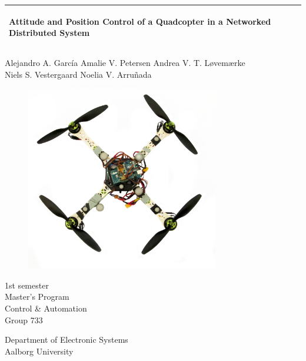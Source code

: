 %
\begin{titlepage}
  \addtolength{\hoffset}{0.5\evensidemargin-0.5\oddsidemargin} %
  \noindent%
  \begin{tabular}{@{}p{\textwidth}@{}}
    \toprule[2pt]
    \midrule
    \vspace{0.2cm}
    \begin{center}
    \Huge{\textbf{
      Attitude and Position Control of a Quadcopter in a Networked Distributed System}}
    \end{center}
	\vspace{0.19cm} \\
    \midrule
    \toprule[2pt]
  \end{tabular}
   \centering
  {
 Alejandro A. García \hspace{0.6 cm} Amalie V. Petersen \hspace{0.6 cm} Andrea V. T. Løvemærke\\

 Niels S. Vestergaard \hspace{0.6 cm}Noelia V. Arruñada}
  \vspace{0 cm}
  \begin{figure}[!ht]
\centering
\includegraphics[width=0.75\textwidth]{figures/quadcopter}
\label{fig:forside}
\end{figure}
  \vspace{-1 cm}
  \begin{center}
    {\large 
    1st semester\\
    Master's Program\\
      Control \& Automation\\
      Group 733 %
    }
  \end{center}
  \vspace{-0.5 cm}
  \begin{center}
  Department of Electronic Systems\\
  Aalborg University
  \end{center}
\end{titlepage}
\clearpage